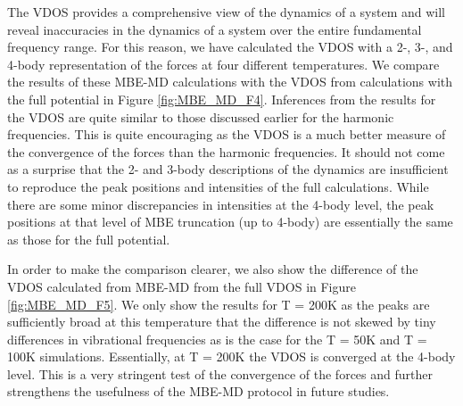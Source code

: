 \documentclass[11pt, proquest]{uwthesis}[2020/02/24]
\begin{document}
\par The VDOS provides a comprehensive view of the dynamics of a system and will reveal inaccuracies in the dynamics of a system over the entire fundamental frequency range. For this reason, we have calculated the VDOS with a 2-, 3-, and 4-body representation of the forces at four different temperatures. We compare the results of these MBE-MD calculations with the VDOS from calculations with the full potential in Figure \ref{fig:MBE_MD_F4}. Inferences from the results for the VDOS are quite similar to those discussed earlier for the harmonic frequencies. This is quite encouraging as the VDOS is a much better measure of the convergence of the forces than the harmonic frequencies. It should not come as a surprise that the 2- and 3-body descriptions of the dynamics are insufficient to reproduce the peak positions and intensities of the full calculations. While there are some minor discrepancies in intensities at the 4-body level, the peak positions at that level of MBE truncation (up to 4-body) are essentially the same as those for the full potential.



\par In order to make the comparison clearer, we also show the difference of the VDOS calculated from MBE-MD from the full VDOS in Figure \ref{fig:MBE_MD_F5}. We only show the results for T = 200K as the peaks are sufficiently broad at this temperature that the difference is not skewed by tiny differences in vibrational frequencies as is the case for the T = 50K and T = 100K simulations. Essentially, at T = 200K the VDOS is converged at the 4-body level. This is a very stringent test of the convergence of the forces and further strengthens the usefulness of the MBE-MD protocol in future studies.
\end{document}
